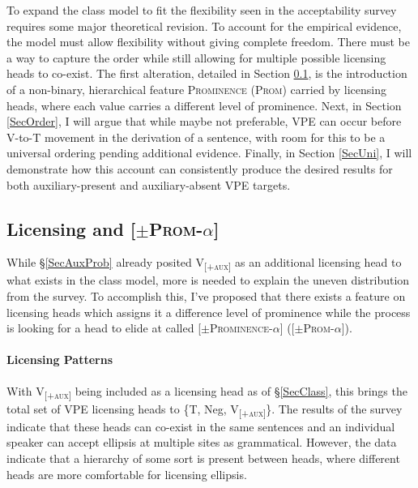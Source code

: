 \documentclass[11pt, oneside]{article}
\begin{document}
To expand the class model to fit the flexibility seen in the acceptability survey requires some major theoretical revision. To account for the empirical evidence, the model must allow flexibility without giving complete freedom. There must be a way to capture the order while still allowing for multiple possible licensing heads to co-exist. The first alteration, detailed in Section \ref{SecAlpha}, is the introduction of a non-binary, hierarchical feature \textsc{Prominence} (\textsc{Prom}) carried by licensing heads, where each value carries a different level of prominence. Next, in Section \ref{SecOrder}, I will argue that while maybe not preferable, VPE can occur before V-to-T movement in the derivation of a sentence, with room for this to be a universal ordering pending additional evidence. Finally, in Section \ref{SecUni}, I will demonstrate how this account can consistently produce the desired results for both auxiliary-present and auxiliary-absent VPE targets.

\subsection{Licensing and [$\pm$\textsc{Prom}-$\alpha$]}\label{SecAlpha}

While \S\ref{SecAuxProb} already posited V\textsubscript{\textsc{[+aux]}} as an additional licensing head to what exists in the class model, more is needed to explain the uneven distribution from the survey. To accomplish this, I've proposed that there exists a feature on licensing heads which assigns it a difference level of prominence while the process is looking for a head to elide at called [$\pm$\textsc{Prominence}-$\alpha$] ([$\pm$\textsc{Prom}-$\alpha$]).

\paragraph{Licensing Patterns} With V\textsubscript{\textsc{[+aux]}} being included as a licensing head as of \S\ref{SecClass}, this brings the total set of VPE licensing heads to \{T, Neg, V\textsubscript{\textsc{[+aux]}}\}. The results of the survey indicate that these heads can co-exist in the same sentences and an individual speaker can accept ellipsis at multiple sites as grammatical. However, the data indicate that a hierarchy of some sort is present between heads, where different heads are more comfortable for licensing ellipsis.
\end{document}
